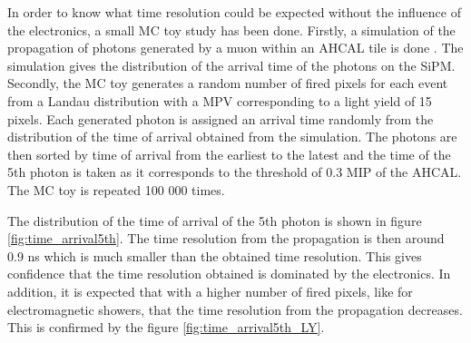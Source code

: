 In order to know what time resolution could be expected without the influence of the electronics, a small MC toy study has been done. Firstly, a \geant simulation of the propagation of photons generated by a muon within an AHCAL tile is done \cite{Liu:2015cpe}. The simulation gives the distribution of the arrival time of the photons on the SiPM. Secondly, the MC toy generates a random number of fired pixels for each event from a Landau distribution with a MPV corresponding to a light yield of 15 pixels. Each generated photon is assigned an arrival time randomly from the distribution of the time of arrival obtained from the simulation. The photons are then sorted by time of arrival from the earliest to the latest and the time of the 5th photon is taken as it corresponds to the threshold of 0.3 MIP of the AHCAL. The MC toy is repeated 100 000 times.

The distribution of the time of arrival of the 5th photon is shown in figure \ref{fig:time_arrival5th}. The time resolution from the propagation is then around 0.9 ns which is much smaller than the obtained time resolution. This gives confidence that the time resolution obtained is dominated by the electronics. In addition, it is expected that with a higher number of fired pixels, like for electromagnetic showers, that the time resolution from the propagation decreases. This is confirmed by the figure \ref{fig:time_arrival5th_LY}.


